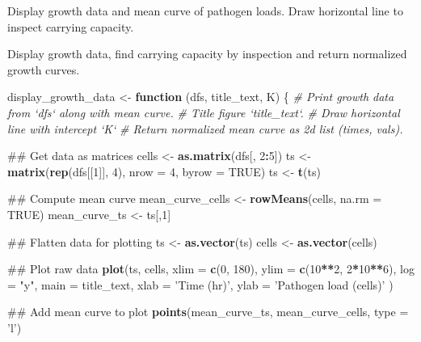 \documentclass[]{article}
\newenvironment{Shaded}{\begin{snugshade}}{\end{snugshade}}
\newcommand{\KeywordTok}[1]{\textcolor[rgb]{0.13,0.29,0.53}{\textbf{#1}}}
\newcommand{\DataTypeTok}[1]{\textcolor[rgb]{0.13,0.29,0.53}{#1}}
\newcommand{\DecValTok}[1]{\textcolor[rgb]{0.00,0.00,0.81}{#1}}
\newcommand{\StringTok}[1]{\textcolor[rgb]{0.31,0.60,0.02}{#1}}
\newcommand{\CommentTok}[1]{\textcolor[rgb]{0.56,0.35,0.01}{\textit{#1}}}
\newcommand{\OtherTok}[1]{\textcolor[rgb]{0.56,0.35,0.01}{#1}}
\newcommand{\ControlFlowTok}[1]{\textcolor[rgb]{0.13,0.29,0.53}{\textbf{#1}}}
\newcommand{\OperatorTok}[1]{\textcolor[rgb]{0.81,0.36,0.00}{\textbf{#1}}}
\newcommand{\NormalTok}[1]{#1}
\begin{document}
Display growth data and mean curve of pathogen loads. Draw horizontal
line to inspect carrying capacity.

Display growth data, find carrying capacity by inspection and return
normalized growth curves.

\begin{Shaded}
\begin{Highlighting}[]
\NormalTok{display_growth_data <-}\StringTok{ }\ControlFlowTok{function}\NormalTok{ (dfs, title_text, K) \{}
  \CommentTok{# Print growth data from `dfs` along with mean curve.}
  \CommentTok{# Title figure `title_text`.}
  \CommentTok{# Draw horizontal line with intercept `K`}
  \CommentTok{# Return normalized mean curve as 2d list (times, vals).}
  
\NormalTok{  ## Get data as matrices}
\NormalTok{  cells <-}\StringTok{ }\KeywordTok{as.matrix}\NormalTok{(dfs[, }\DecValTok{2}\OperatorTok{:}\DecValTok{5}\NormalTok{])}
\NormalTok{  ts <-}\StringTok{ }\KeywordTok{matrix}\NormalTok{(}\KeywordTok{rep}\NormalTok{(dfs[[}\DecValTok{1}\NormalTok{]], }\DecValTok{4}\NormalTok{), }\DataTypeTok{nrow =} \DecValTok{4}\NormalTok{, }\DataTypeTok{byrow =} \OtherTok{TRUE}\NormalTok{)}
\NormalTok{  ts <-}\StringTok{ }\KeywordTok{t}\NormalTok{(ts)}

\NormalTok{  ## Compute mean curve}
\NormalTok{  mean_curve_cells <-}\StringTok{ }\KeywordTok{rowMeans}\NormalTok{(cells, }\DataTypeTok{na.rm =} \OtherTok{TRUE}\NormalTok{) }
\NormalTok{  mean_curve_ts <-}\StringTok{ }\NormalTok{ts[,}\DecValTok{1}\NormalTok{]}
  
\NormalTok{  ## Flatten data for plotting}
\NormalTok{  ts <-}\StringTok{ }\KeywordTok{as.vector}\NormalTok{(ts)}
\NormalTok{  cells <-}\StringTok{ }\KeywordTok{as.vector}\NormalTok{(cells)}
  
\NormalTok{  ## Plot raw data}
  \KeywordTok{plot}\NormalTok{(ts, cells, }
       \DataTypeTok{xlim =} \KeywordTok{c}\NormalTok{(}\DecValTok{0}\NormalTok{, }\DecValTok{180}\NormalTok{), }
       \DataTypeTok{ylim =} \KeywordTok{c}\NormalTok{(}\DecValTok{10}\OperatorTok{**}\DecValTok{2}\NormalTok{, }\DecValTok{2}\OperatorTok{*}\DecValTok{10}\OperatorTok{**}\DecValTok{6}\NormalTok{), }
       \DataTypeTok{log =} \StringTok{"y"}\NormalTok{, }
       \DataTypeTok{main =}\NormalTok{ title_text,}
       \DataTypeTok{xlab =} \StringTok{'Time (hr)'}\NormalTok{,}
       \DataTypeTok{ylab =} \StringTok{'Pathogen load (cells)'}
\NormalTok{       )}
  
\NormalTok{  ## Add mean curve to plot}
  \KeywordTok{points}\NormalTok{(mean_curve_ts, mean_curve_cells, }\DataTypeTok{type =} \StringTok{'l'}\NormalTok{)}
  

\end{Highlighting}
\end{Shaded}
\end{document}
